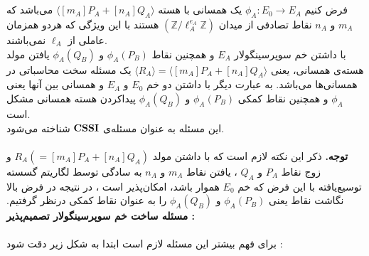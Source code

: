 \\
\\
فرض کنیم 
$\phi_A :‌E_0 \rightarrow E_A $
یک همسانی  با هسته 
$\langle [m_A]P_A + [n_A]Q_A \rangle $
می‌باشد که
$m_A$
و
$n_A$
نقاط تصادفی از میدان
$ (\mathbb{Z} / \ell_A^{e_A} \mathbb{Z}) $
هستند با این ویژگی که هردو همزمان عاملی از
$\ell_A$
نمی‌باشند.
\\
 با داشتن خم سوپرسینگولار
$E_A$
و همچنین نقاط 
$\phi_A(P_B)$
و
$\phi_A(Q_B)$
 یافتن مولد هسته‌ی همسانی، یعنی
$\langle R_A \rangle  = \langle [m_A]P_A + [n_A]Q_A \rangle $
یک مسئله سخت محاسباتی در همسانی‌ها می‌باشد. به عبارت دیگر با داشتن دو خم 
$E_0$
و
$E_A$
و همسانی بین آنها یعنی
$\phi_{A}$
و همچنین نقاط کمکی 
$\phi_A(P_B)$
و
$\phi_A(Q_B)$
 پیداکردن هسته همسانی مشکل است.
\\
 این مسئله به عنوان مسئله‌ی 
$\bf {CSSI}$
شناخته می‌شود.
\\
\\
\textbf{توجه.}
ذکر این نکته لازم است که با داشتن مولد
$R_A(= [m_A]P_A + [n_A]Q_A)$
و زوج نقاط
$P_A$
و
$Q_A$
، یافتن نقاط
$m_A$
و
$n_A$
به سادگی توسط لگاریتم گسسته توسیع‌یافته
 با این فرض که خم 
$E_0$
هموار باشد، امکان‌پذیر است
\cite{eDS}
، در نتیجه در فرض بالا نگاشت نقاط یعنی
$\phi_A(P_B)$
و
$\phi_A(Q_B)$
را به عنوان نقاط کمکی درنظر گرفتیم.
\newpage
\textbf{ مسئله ساخت خم سوپرسینگولار تصمیم‌پذیر : }
\\
\\
 برای فهم بیشتر این مسئله لازم است ابتدا به شکل زیر دقت شود :
 
 \begin{figure}[H] 
 	\begin{center}
 		
 		
 		\caption{
 		}
 		\label{fig:dssp}
 		
 	\end{center}
 \end{figure}

